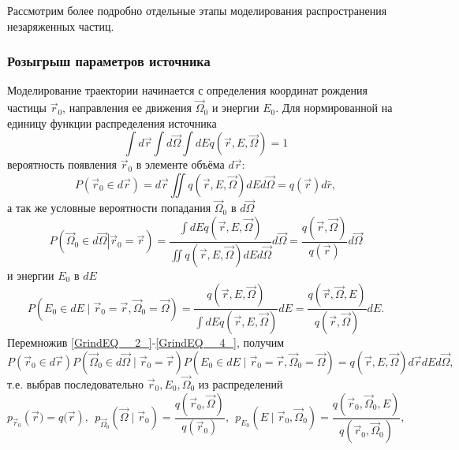 \documentclass[
11pt,
master, %
subf, %
href, %
colorlinks=true, %
]{disser}
\begin{document}
Рассмотрим более подробно отдельные этапы моделирования распространения незаряженных частиц.

\subsubsection{Розыгрыш параметров источника}

Моделирование траектории начинается с определения координат рождения частицы $\vec{r}_{0} $, направления ее движения $\vec{\Omega }_{0} $ и энергии $E_{0} $. Для нормированной на единицу функции распределения источника
\[
\int d \vec{r}\int d \vec{\Omega }\int dE q\left(\vec{r},E,\vec{\Omega }\right)=1
\]
вероятность появления $\vec{r}_{0} $ в элементе объёма $d\vec{r}$:
\begin{equation} \label{GrindEQ__2_}
P\left(\vec{r}_{0} \in d\vec{r} \right)=d\vec{r}\iint q \left(\vec{r},E,\vec{\Omega } \right) dEd\vec{\Omega }=q \left(\vec{r} \right)d\bar{r},
\end{equation}
а так же условные вероятности попадания $\vec{\Omega }_{0} $ в $d\vec{\Omega }$
\begin{equation} \label{GrindEQ__3_}
P \left(\vec{\Omega }_{0} \in d\vec{\Omega }\left|\vec{r}_{0} \right. =\vec{r} \right)=\frac{\int dE q \left(\vec{r},E,\vec{\Omega } \right)}{\iint q \left(\vec{r},E,\vec{\Omega } \right) dEd\vec{\Omega }} d\vec{\Omega }=\frac{q \left(\vec{r},\vec{\Omega } \right)}{q \left(\vec{r} \right)} d\vec{\Omega }
\end{equation}
и энергии $E_{0} $ в $dE$
\begin{equation} \label{GrindEQ__4_}
P \left(E_{0} \in dE \mid \vec{r}_{0} =\vec{r},\vec{\Omega }_{0} =\vec{\Omega } \right) = \frac{q \left(\vec{r},E,\vec{\Omega } \right)}{\int dE q \left(\vec{r},E,\vec{\Omega } \right)} dE=\frac{q \left(\vec{r},\vec{\Omega },E \right)}{q \left(\vec{r},\vec{\Omega } \right)} dE.
\end{equation}
Перемножив \eqref{GrindEQ__2_}-\eqref{GrindEQ__4_}, получим
\begin{equation} \label{GrindEQ__5_}
P \left(\vec{r}_{0} \in d\vec{r} \right)P \left(\vec{\Omega }_{0} \in d\vec{\Omega } \mid \vec{r}_{0}  =\vec{r} \right)P \left(E_{0} \in dE \mid \vec{r}_{0} =\vec{r},\vec{\Omega }_{0} =\vec{\Omega } \right)=q \left(\vec{r},E,\vec{\Omega } \right)d\vec{r}dEd\vec{\Omega },
\end{equation}
т.е. выбрав последовательно $\vec{r}_{0},  E_{0}, \vec{\Omega }_{0} $ из распределений
\begin{equation} \label{GrindEQ__6_}
p_{\vec{r}_{0} } \left(\vec{r})=q(\vec{r} \right), ~~ p_{\vec{\Omega }_{0} } \left( \vec{\Omega } \mid \vec{r}_{0} \right) = \frac{q \left(\vec{r}_{0} ,\vec{\Omega } \right)}{q \left(\vec{r}_{0} \right)}, ~~ p_{E_{0} } \left(E \mid \vec{r}_{0} ,\vec{\Omega }_{0} \right)=\frac{q \left(\vec{r}_{0} ,\vec{\Omega }_{0} ,E \right)}{q \left(\vec{r}_{0} ,\vec{\Omega }_{0} \right)} ,
\end{equation}
\end{document}
